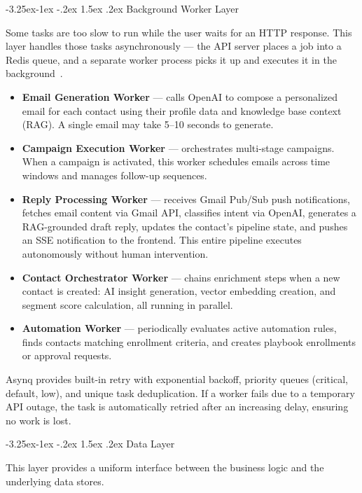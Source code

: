 \documentclass[a4paper]{article}
\makeatletter
\newcounter {subsubsubsection}[subsubsection]
\newcommand\subsubsubsection{\@startsection{subsubsubsection}{4}{\z@}%
	{-3.25ex\@plus -1ex \@minus -.2ex}%
	{1.5ex \@plus .2ex}%
	{\normalfont\normalsize\bfseries}}
\makeatother
\begin{document}
\subsubsubsection{Background Worker Layer}

Some tasks are too slow to run while the user waits for an HTTP 
response. This layer handles those tasks asynchronously --- the API 
server places a job into a Redis queue, and a separate worker 
process picks it up and executes it in the 
background~\cite{asynq_github}.

\begin{itemize}
    \item \textbf{Email Generation Worker} --- calls OpenAI to 
    compose a personalized email for each contact using their 
    profile data and knowledge base context (RAG). A single email 
    may take 5--10 seconds to generate.
    \item \textbf{Campaign Execution Worker} --- orchestrates 
    multi-stage campaigns. When a campaign is activated, this 
    worker schedules emails across time windows and manages 
    follow-up sequences.
    \item \textbf{Reply Processing Worker} --- receives Gmail 
    Pub/Sub push notifications, fetches email content via Gmail 
    API, classifies intent via OpenAI, generates a RAG-grounded 
    draft reply, updates the contact's pipeline state, and pushes 
    an SSE notification to the frontend. This entire pipeline 
    executes autonomously without human intervention.
    \item \textbf{Contact Orchestrator Worker} --- chains 
    enrichment steps when a new contact is created: AI insight 
    generation, vector embedding creation, and segment score 
    calculation, all running in parallel.
    \item \textbf{Automation Worker} --- periodically evaluates 
    active automation rules, finds contacts matching enrollment 
    criteria, and creates playbook enrollments or approval 
    requests.
\end{itemize}

Asynq provides built-in retry with exponential backoff, priority 
queues (critical, default, low), and unique task deduplication. 
If a worker fails due to a temporary API outage, the task is 
automatically retried after an increasing delay, ensuring no work 
is lost.

\subsubsubsection{Data Layer}

This layer provides a uniform interface between the business logic 
and the underlying data stores.
\end{document}
